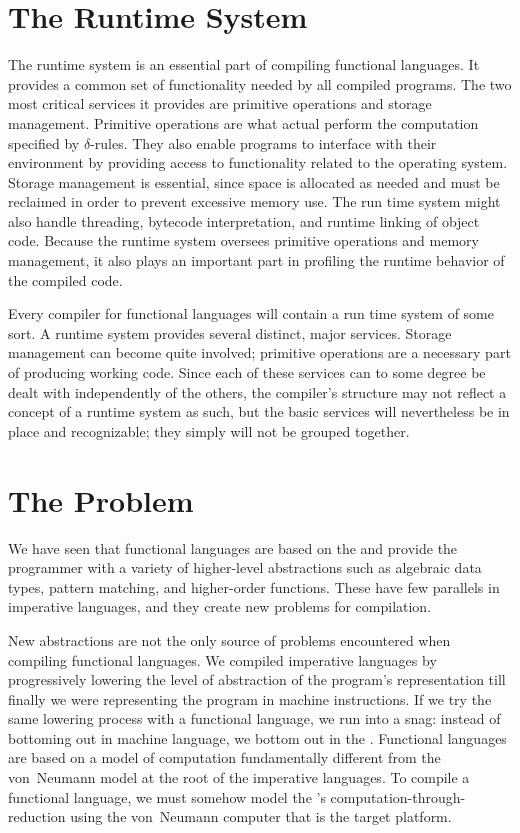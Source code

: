 \section{The Runtime System}
The runtime system is an essential part of compiling functional languages. It provides a common set of functionality needed by all compiled programs. The two most critical services it provides are primitive operations and storage management. Primitive operations are what actual perform the computation specified by $\delta$-rules. They also enable programs to interface with their environment by providing access to functionality related to the operating system. Storage management is essential, since space is allocated as needed and must be reclaimed in order to prevent excessive memory use. The run time system might also handle threading, bytecode interpretation, and runtime linking of object code. Because the runtime system oversees primitive operations and memory management, it also plays an important part in profiling the runtime behavior of the compiled code.

Every compiler for functional languages will contain a run time system of some sort. A runtime system provides several distinct, major services. Storage management can become quite involved; primitive operations are a necessary part of producing working code. Since each of these services can to some degree be dealt with independently of the others, the compiler's structure may not reflect a concept of a runtime system as such, but the basic services will nevertheless be in place and recognizable; they simply will not be grouped together.

\section{The Problem}
We have seen that functional languages are based on the \lambdacalc and provide the programmer with a variety of higher-level abstractions such as algebraic data types, pattern matching, and higher-order functions. These have few parallels in imperative languages, and they create new problems for compilation.

New abstractions are not the only source of problems encountered when compiling functional languages. We compiled imperative languages by progressively lowering the level of abstraction of the program's representation till finally we were representing the program in machine instructions. If we try the same lowering process with a functional language, we run into a snag: instead of bottoming out in machine language, we bottom out in the \lambdacalc{}. Functional languages are based on a model of computation fundamentally different from the von~Neumann model at the root of the imperative languages. To compile a functional language, we must somehow model the \lambdacalc{}'s computation-through-reduction using the von~Neumann computer that is the target platform.

